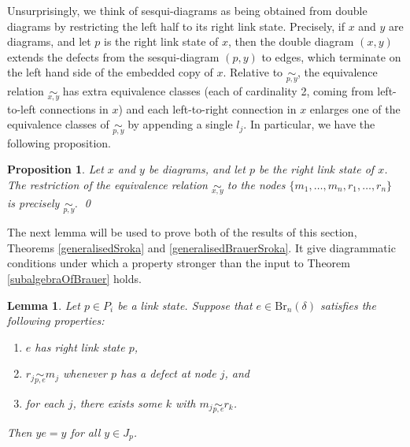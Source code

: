 \documentclass[12pt]{amsart}
\theoremstyle{plain}
\theoremstyle{definition} \newtheorem{definition}[theorem]{Definition}
\theoremstyle{plain}
\newtheorem{lemma}[theorem]{Lemma}
\theoremstyle{plain} \newtheorem{proposition}[theorem]{Proposition}
\theoremstyle{plain} \newtheorem{conjecture}[theorem]{Conjecture}
\theoremstyle{plain} \newtheorem{corollary}[theorem]{Corollary}
\theoremstyle{remark} \newtheorem{claim}[theorem]{Claim}
\theoremstyle{remark} \newtheorem{remark}[theorem]{Remark}
\theoremstyle{remark} \newtheorem{example}[theorem]{Example}
\theoremstyle{remark} \newtheorem{comment}[theorem]{Comment}
\theoremstyle{definition} \newtheorem{question}[theorem]{Question}
\newcommand{\Brauer}{\mathrm{Br}}
\begin{document}
Unsurprisingly, we think of sesqui-diagrams as being obtained from double diagrams by restricting the left half to its right link state. Precisely, if $x$ and $y$ are diagrams, and let $p$ is the right link state of $x$, then the double diagram $(x,y)$ extends the defects from the sesqui-diagram $(p,y)$ to edges, which terminate on the left hand side of the embedded copy of $x$. Relative to $\underset{p,y}{\sim}$, the equivalence relation $\underset{x,y}{\sim}$ has extra equivalence classes (each of cardinality 2, coming from left-to-left connections in $x$) and each left-to-right connection in $x$ enlarges one of the equivalence classes of $\underset{p,y}{\sim}$ by appending a single $l_j$. In particular, we have the following proposition.

\begin{proposition} \label{doubleToSesqui} Let $x$ and $y$ be diagrams, and let $p$ be the right link state of $x$. The restriction of the equivalence relation $\underset{x,y}{\sim}$ to the nodes $\{m_1, \dots, m_n, r_1, \dots, r_n\}$ is precisely $\underset{p,y}{\sim}$. \qed \end{proposition}

The next lemma will be used to prove both of the results of this section, Theorems \ref{generalisedSroka} and \ref{generalisedBrauerSroka}. It give  diagrammatic conditions under which a property stronger than the input to Theorem \ref{subalgebraOfBrauer} holds.

\begin{lemma} \label{LSControl} Let $p \in P_i$ be a link state. Suppose that $e \in \Brauer_n(\delta)$ satisfies the following properties:
\begin{enumerate}
    \item $e$ has right link state $p$, \label{eT1}
    \item $r_j \underset{p,e}{\sim} m_j$ whenever $p$ has a defect at node $j$, and \label{eT2}
    \item for each $j$, there exists some $k$ with $m_j \underset{p,e}{\sim} r_k$. \label{eT3}
\end{enumerate}
Then $y e = y$ for all $y \in J_p$. \end{lemma}
\end{document}
